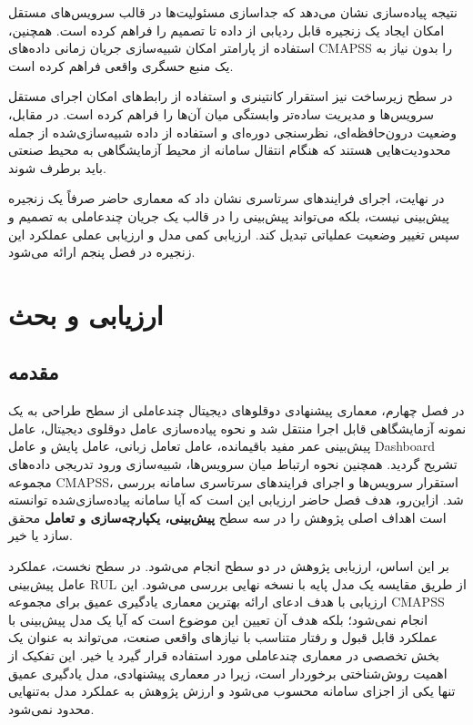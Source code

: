 نتیجه پیاده‌سازی نشان می‌دهد که جداسازی مسئولیت‌ها در قالب سرویس‌های مستقل امکان ایجاد یک زنجیره قابل ردیابی از داده تا تصمیم را فراهم کرده است. همچنین، استفاده از پارامتر  امکان شبیه‌سازی جریان زمانی داده‌های \gls{CMAPSS} را بدون نیاز به یک منبع حسگری واقعی فراهم کرده است.

در سطح زیرساخت نیز استقرار کانتینری و استفاده از رابط‌های  امکان اجرای مستقل سرویس‌ها و مدیریت ساده‌تر وابستگی میان آن‌ها را فراهم کرده است. در مقابل، وضعیت درون‌حافظه‌ای، نظرسنجی دوره‌ای و استفاده از داده شبیه‌سازی‌شده از جمله محدودیت‌هایی هستند که هنگام انتقال سامانه از محیط آزمایشگاهی به محیط صنعتی باید برطرف شوند.

در نهایت، اجرای فرایند‌های سرتاسری نشان داد که معماری حاضر صرفاً یک زنجیره پیش‌بینی نیست، بلکه می‌تواند پیش‌بینی را در قالب یک جریان چندعاملی به تصمیم و سپس تغییر وضعیت عملیاتی تبدیل کند. ارزیابی کمی مدل و ارزیابی عملی عملکرد این زنجیره در فصل پنجم ارائه می‌شود.


\chapter{ارزیابی و بحث}
\label{chap:eval}

\section{مقدمه}
\label{sec:eval-introduction}

در فصل چهارم، معماری پیشنهادی دوقلوهای دیجیتال چندعاملی از سطح طراحی به یک نمونه آزمایشگاهی قابل اجرا منتقل شد و نحوه پیاده‌سازی عامل دوقلوی دیجیتال، عامل پیش‌بینی عمر مفید باقیمانده، عامل تعامل زبانی، عامل پایش و عامل \gls{Dashboard} تشریح گردید. همچنین نحوه ارتباط میان سرویس‌ها، شبیه‌سازی ورود تدریجی داده‌های مجموعه \gls{CMAPSS}، استقرار سرویس‌ها و اجرای فرایندهای سرتاسری سامانه بررسی شد. ازاین‌رو، هدف فصل حاضر ارزیابی این است که آیا سامانه پیاده‌سازی‌شده توانسته است اهداف اصلی پژوهش را در سه سطح \textbf{پیش‌بینی، یکپارچه‌سازی و تعامل} محقق سازد یا خیر.

بر این اساس، ارزیابی پژوهش در دو سطح انجام می‌شود. در سطح نخست، عملکرد عامل پیش‌بینی \gls{RUL} از طریق مقایسه یک مدل پایه با نسخه نهایی بررسی می‌شود. این ارزیابی با هدف ادعای ارائه بهترین معماری یادگیری عمیق برای مجموعه \gls{CMAPSS} انجام نمی‌شود؛ بلکه هدف آن تعیین این موضوع است که آیا یک مدل پیش‌بینی با عملکرد قابل قبول و رفتار متناسب با نیازهای واقعی صنعت، می‌تواند به عنوان یک بخش تخصصی در معماری چندعاملی مورد استفاده قرار گیرد یا خیر. این تفکیک از اهمیت روش‌شناختی برخوردار است، زیرا در معماری پیشنهادی، مدل یادگیری عمیق تنها یکی از اجزای سامانه محسوب می‌شود و ارزش پژوهش به عملکرد مدل به‌تنهایی محدود نمی‌شود.

